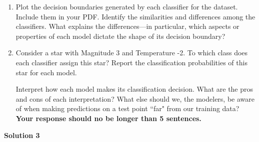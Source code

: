 \documentclass[submit]{harvardml}
\begin{document}
\begin{problem}
\begin{enumerate}
    \item Plot the decision boundaries generated by each classifier for the dataset. Include them in your PDF. 
    Identify the similarities and differences among the classifiers. What explains the differences---in particular, which aspects or properties of each model dictate the shape of its decision boundary? 
    
    \item 
    
    Consider a star with Magnitude 3 and Temperature -2. To which class does each classifier assign this star? Report the classification probabilities of this star for each model. 
    
    Interpret how each model makes its classification decision. What are the pros and cons of each interpretation? What else should we, the modelers, be aware of when making predictions on a test point ``far" from our training data? \textbf{Your response should no be longer than 5 sentences.}
\end{enumerate}
\end{problem}

\newpage

\textbf{Solution 3}
\end{document}
